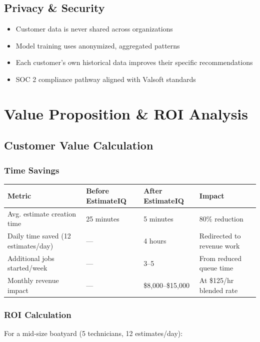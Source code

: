 \documentclass[11pt,a4paper]{article}
\begin{document}
\subsection{Privacy \& Security}

\begin{itemize}[leftmargin=*]
    \item Customer data is never shared across organizations
    \item Model training uses anonymized, aggregated patterns
    \item Each customer's own historical data improves their specific recommendations
    \item SOC 2 compliance pathway aligned with Valsoft standards
\end{itemize}

\newpage
\section{Value Proposition \& ROI Analysis}

\subsection{Customer Value Calculation}

\subsubsection*{Time Savings}
\begin{table}[H]
\centering
\small
\begin{tabularx}{\textwidth}{@{}L{4cm}C{3cm}C{3cm}L{3.5cm}@{}}
\toprule
\textbf{Metric} & \textbf{Before EstimateIQ} & \textbf{After EstimateIQ} & \textbf{Impact} \\
\midrule
Avg. estimate creation time & 25 minutes & 5 minutes & 80\% reduction \\
Daily time saved (12 estimates/day) & --- & 4 hours & Redirected to revenue work \\
Additional jobs started/week & --- & 3--5 & From reduced queue time \\
Monthly revenue impact & --- & \$8,000--\$15,000 & At \$125/hr blended rate \\
\bottomrule
\end{tabularx}
\end{table}

\subsubsection*{ROI Calculation}
For a mid-size boatyard (5 technicians, 12 estimates/day):
\end{document}
